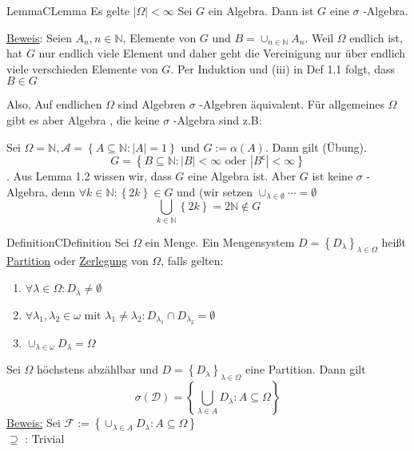 \documentclass[11.5 pt, a4paper]{memoir}
\begin{document}
\begin{ibox}[1.5]{Lemma}{CLemma}
    Es gelte $ |\Omega | < \infty $  Sei $ G $ ein Algebra. Dann ist $ G  $ eine $ \sigma $ -Algebra.
\end{ibox}
\underline{Beweis}: Seien $ A_n, n \in \mathbb{N} $, Elemente von $ G $ und $ B = \cup_{n \in \mathbb{N}}A_n $. Weil $ \Omega  $ 
endlich ist, hat $ G $ nur endlich viele Element und daher geht die Vereinigung nur über endlich viele verschieden Elemente von $ G $.
Per Induktion und (iii) in Def 1.1 folgt, dass $ B \in G $  


Also, Auf endlichen $ \Omega  $ sind Algebren $ \sigma $ -Algebren äquivalent. Für allgemeines $ \Omega  $ gibt es aber Algebra , die
keine $ \sigma $ -Algebra sind z.B:

Sei $ \Omega = \mathbb{N}, \mathcal{A} = \left\{ A \subseteq \mathbb{N} : |A| = 1 \right\} \text{ und }  G := \alpha (A) $. Dann
gilt (Übung). 
$$ G = \left\{ B \subseteq \mathbb{N} : |B| < \infty \text{ oder } |B^\mathsf{c}| < \infty  \right\} $$.
Aus Lemma 1.2 wissen wir, dass $ G $ eine Algebra ist. Aber $ G $ ist keine $ \sigma $ -Algebra, denn $ \forall k \in \mathbb{N}:
\left\{ 2k \right\} \in G$ und (wir setzen $ \cup_{\lambda \in \emptyset} \cdots = \emptyset $ 
$$ \bigcup_{k \in \mathbb{N}} \left\{ 2k \right\} = 2 \mathbb{N} \notin G $$

\begin{ibox}[1.7]{Definition}{CDefinition}
	Sei $ \Omega  $ ein Menge. Ein Mengensystem $ D = \left\{ D_{\lambda} \right\}_{\lambda \in \Omega } $ heißt \underline{Partition}
	oder \underline{Zerlegung} von $ \Omega  $, falls gelten:
	\begin{enumerate}[label=\alph*)]
		\item $ \forall \lambda \in \Omega : D_{\lambda} \neq \emptyset $ 
		\item $ \forall \lambda_1, \lambda_2 \in \omega  $ mit $ \lambda_1 \neq \lambda_2: D_{\lambda_1} \cap D_{\lambda_2} = \emptyset $ 
		\item $ \cup_{\lambda \in \omega } D_{\lambda} = \Omega $ 
	\end{enumerate}
\end{ibox}
	Sei $ \Omega  $ höchstens abzählbar und $ D = \left\{ D_{\lambda} \right\}_{\lambda \in \Omega } $ eine Partition. Dann gilt 
	$$ \sigma (\mathcal{D}) = \left\{ \bigcup_{\lambda \in A} D_{\lambda} : A \subseteq \Omega  \right\}$$
	\underline{Beweis:} Sei $ \mathcal{F} := \left\{ \cup_{\lambda \in A} D_{\lambda}: A \subseteq \Omega \right\} $  \\
	 \underline{$ \supseteq $} : \;   Trivial\\
\end{document}
